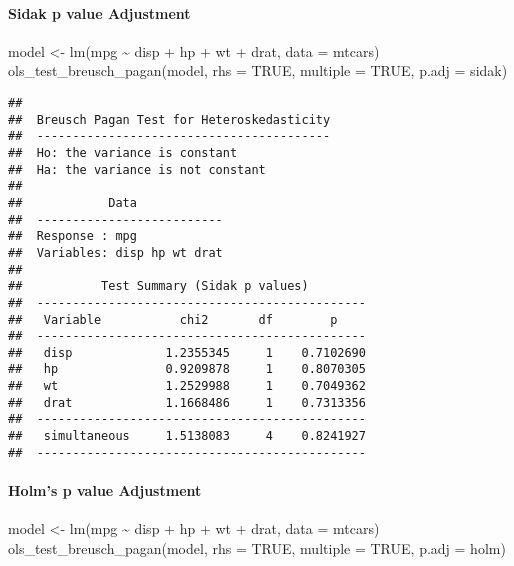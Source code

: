 \documentclass[
]{article}
\newenvironment{Shaded}{\begin{snugshade}}{\end{snugshade}}
\newcommand{\AttributeTok}[1]{\textcolor[rgb]{0.77,0.63,0.00}{#1}}
\newcommand{\ConstantTok}[1]{\textcolor[rgb]{0.00,0.00,0.00}{#1}}
\newcommand{\FunctionTok}[1]{\textcolor[rgb]{0.00,0.00,0.00}{#1}}
\newcommand{\NormalTok}[1]{#1}
\newcommand{\OtherTok}[1]{\textcolor[rgb]{0.56,0.35,0.01}{#1}}
\newcommand{\SpecialCharTok}[1]{\textcolor[rgb]{0.00,0.00,0.00}{#1}}
\newcommand{\StringTok}[1]{\textcolor[rgb]{0.31,0.60,0.02}{#1}}
\begin{document}
\hypertarget{sidak-p-value-adjustment}{%
\paragraph{Sidak p value Adjustment}\label{sidak-p-value-adjustment}}

\begin{Shaded}
\begin{Highlighting}[]
\NormalTok{model }\OtherTok{\textless{}{-}} \FunctionTok{lm}\NormalTok{(mpg }\SpecialCharTok{\textasciitilde{}}\NormalTok{ disp }\SpecialCharTok{+}\NormalTok{ hp }\SpecialCharTok{+}\NormalTok{ wt }\SpecialCharTok{+}\NormalTok{ drat, }\AttributeTok{data =}\NormalTok{ mtcars)}
\FunctionTok{ols\_test\_breusch\_pagan}\NormalTok{(model, }\AttributeTok{rhs =} \ConstantTok{TRUE}\NormalTok{, }\AttributeTok{multiple =} \ConstantTok{TRUE}\NormalTok{, }\AttributeTok{p.adj =} \StringTok{\textquotesingle{}sidak\textquotesingle{}}\NormalTok{)}
\end{Highlighting}
\end{Shaded}

\begin{verbatim}
## 
##  Breusch Pagan Test for Heteroskedasticity
##  -----------------------------------------
##  Ho: the variance is constant            
##  Ha: the variance is not constant        
## 
##            Data            
##  --------------------------
##  Response : mpg 
##  Variables: disp hp wt drat 
## 
##           Test Summary (Sidak p values)          
##  ----------------------------------------------
##   Variable           chi2       df        p     
##  ----------------------------------------------
##   disp             1.2355345     1    0.7102690 
##   hp               0.9209878     1    0.8070305 
##   wt               1.2529988     1    0.7049362 
##   drat             1.1668486     1    0.7313356 
##  ----------------------------------------------
##   simultaneous     1.5138083     4    0.8241927 
##  ----------------------------------------------
\end{verbatim}

\hypertarget{holms-p-value-adjustment}{%
\paragraph{Holm's p value Adjustment}\label{holms-p-value-adjustment}}

\begin{Shaded}
\begin{Highlighting}[]
\NormalTok{model }\OtherTok{\textless{}{-}} \FunctionTok{lm}\NormalTok{(mpg }\SpecialCharTok{\textasciitilde{}}\NormalTok{ disp }\SpecialCharTok{+}\NormalTok{ hp }\SpecialCharTok{+}\NormalTok{ wt }\SpecialCharTok{+}\NormalTok{ drat, }\AttributeTok{data =}\NormalTok{ mtcars)}
\FunctionTok{ols\_test\_breusch\_pagan}\NormalTok{(model, }\AttributeTok{rhs =} \ConstantTok{TRUE}\NormalTok{, }\AttributeTok{multiple =} \ConstantTok{TRUE}\NormalTok{, }\AttributeTok{p.adj =} \StringTok{\textquotesingle{}holm\textquotesingle{}}\NormalTok{)}
\end{Highlighting}
\end{Shaded}
\end{document}
